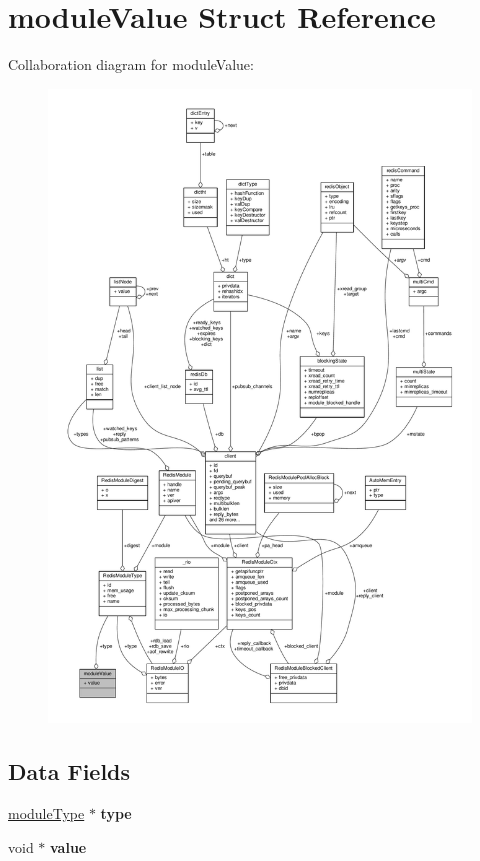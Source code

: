 \hypertarget{structmoduleValue}{}\section{module\+Value Struct Reference}
\label{structmoduleValue}


Collaboration diagram for module\+Value\+:\nopagebreak
\begin{figure}[H]
\begin{center}
\leavevmode
\includegraphics[width=350pt]{structmoduleValue__coll__graph}
\end{center}
\end{figure}
\subsection*{Data Fields}
\begin{DoxyCompactItemize}
\item 
\mbox{\label{structmoduleValue_a018030bdef293e270f1cb07a3d9ec41b}} 
\hyperlink{structRedisModuleType}{module\+Type} $\ast$ {\bfseries type}
\item 
\mbox{\label{structmoduleValue_ab1e8fd55bbd6d21c650d3a363a559bb8}} 
void $\ast$ {\bfseries value}
\end{DoxyCompactItemize}


